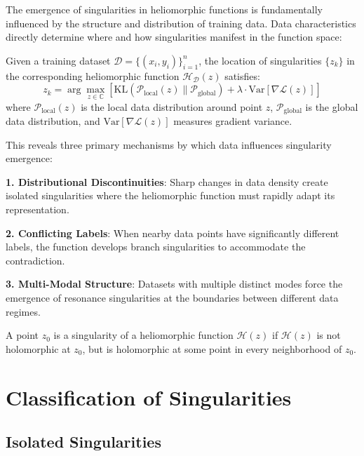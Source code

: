 The emergence of singularities in heliomorphic functions is fundamentally influenced by the structure and distribution of training data. Data characteristics directly determine where and how singularities manifest in the function space:

\begin{theorem}
Given a training dataset $\mathcal{D} = \{(x_i, y_i)\}_{i=1}^n$, the location of singularities $\{z_k\}$ in the corresponding heliomorphic function $\mathcal{H}_{\mathcal{D}}(z)$ satisfies:
\begin{equation}
z_k = \arg\max_{z \in \mathbb{C}} \left[\text{KL}(\mathcal{P}_{\text{local}}(z) \| \mathcal{P}_{\text{global}}) + \lambda \cdot \text{Var}[\nabla \mathcal{L}(z)]\right]
\end{equation}
where $\mathcal{P}_{\text{local}}(z)$ is the local data distribution around point $z$, $\mathcal{P}_{\text{global}}$ is the global data distribution, and $\text{Var}[\nabla \mathcal{L}(z)]$ measures gradient variance.
\end{theorem}

This reveals three primary mechanisms by which data influences singularity emergence:

\textbf{1. Distributional Discontinuities}: Sharp changes in data density create isolated singularities where the heliomorphic function must rapidly adapt its representation.

\textbf{2. Conflicting Labels}: When nearby data points have significantly different labels, the function develops branch singularities to accommodate the contradiction.

\textbf{3. Multi-Modal Structure}: Datasets with multiple distinct modes force the emergence of resonance singularities at the boundaries between different data regimes.

\begin{definition}
A point $z_0$ is a singularity of a heliomorphic function $\mathcal{H}(z)$ if $\mathcal{H}(z)$ is not holomorphic at $z_0$, but is holomorphic at some point in every neighborhood of $z_0$.
\end{definition}

\section{Classification of Singularities}

\subsection{Isolated Singularities}

